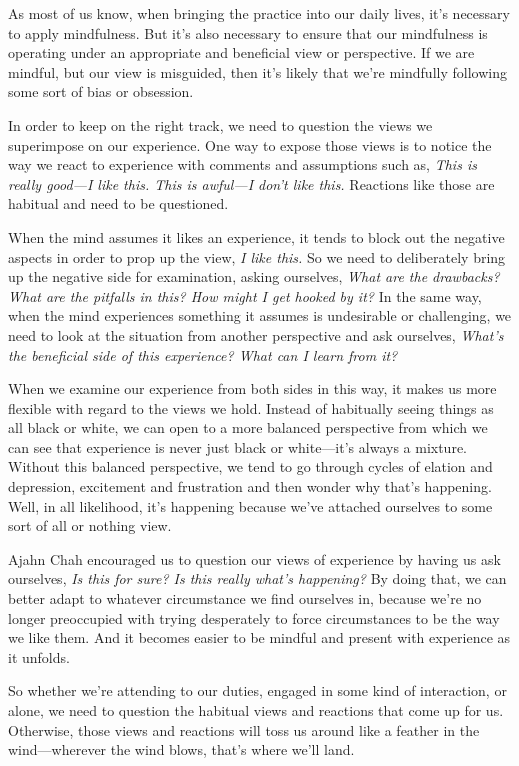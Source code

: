 As most of us know, when bringing the practice into our daily lives, 
it's necessary to apply mindfulness. But it's also necessary to ensure 
that our mindfulness is operating under an appropriate and beneficial 
view or perspective. If we are mindful, but our view is misguided, then 
it's likely that we're mindfully following some sort of bias or 
obsession.

In order to keep on the right track, we need to question the views we 
superimpose on our experience. One way to expose those views is to 
notice the way we react to experience with comments and assumptions 
such as, \emph{This is really good---I like this. This is awful---I 
don't like this.} Reactions like those are habitual and need to be 
questioned.

When the mind assumes it likes an experience, it tends to block out the 
negative aspects in order to prop up the view, \emph{I like this.} So 
we need to deliberately bring up the negative side for examination, 
asking ourselves, \emph{What are the drawbacks? What are the pitfalls 
in this? How might I get hooked by it?} In the same way, when the mind 
experiences something it assumes is undesirable or challenging, we need 
to look at the situation from another perspective and ask ourselves, 
\emph{What's the beneficial side of this experience? What can I learn 
from it?}

When we examine our experience from both sides in this way, it makes us 
more flexible with regard to the views we hold. Instead of habitually 
seeing things as all black or white, we can open to a more balanced 
perspective from which we can see that experience is never just black 
or white---it's always a mixture. Without this balanced perspective, we 
tend to go through cycles of elation and depression, excitement and 
frustration and then wonder why that's happening. Well, in all 
likelihood, it's happening because we've attached ourselves to some 
sort of all or nothing view.

Ajahn Chah encouraged us to question our views of experience by having 
us ask ourselves, \emph{Is this for sure? Is this really what's 
happening?} By doing that, we can better adapt to whatever circumstance 
we find ourselves in, because we're no longer preoccupied with trying 
desperately to force circumstances to be the way we like them. And it 
becomes easier to be mindful and present with experience as it unfolds.

So whether we're attending to our duties, engaged in some kind of 
interaction, or alone, we need to question the habitual views and 
reactions that come up for us. Otherwise, those views and reactions 
will toss us around like a feather in the wind---wherever the wind 
blows, that's where we'll land.

